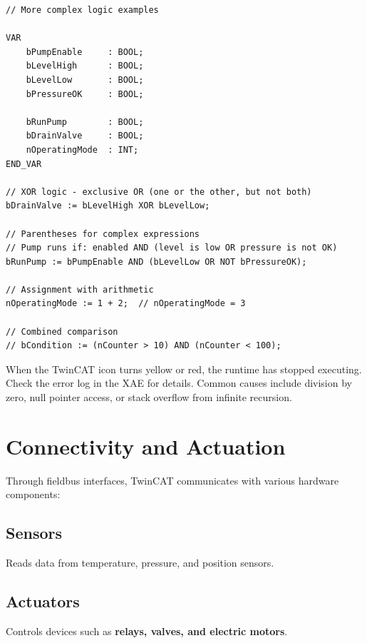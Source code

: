 \documentclass[11pt,a4paper]{article}
\begin{document}
\begin{lstlisting}
// More complex logic examples

VAR
    bPumpEnable     : BOOL;
    bLevelHigh      : BOOL;
    bLevelLow       : BOOL;
    bPressureOK     : BOOL;
    
    bRunPump        : BOOL;
    bDrainValve     : BOOL;
    nOperatingMode  : INT;
END_VAR

// XOR logic - exclusive OR (one or the other, but not both)
bDrainValve := bLevelHigh XOR bLevelLow;

// Parentheses for complex expressions
// Pump runs if: enabled AND (level is low OR pressure is not OK)
bRunPump := bPumpEnable AND (bLevelLow OR NOT bPressureOK);

// Assignment with arithmetic
nOperatingMode := 1 + 2;  // nOperatingMode = 3

// Combined comparison
// bCondition := (nCounter > 10) AND (nCounter < 100);
\end{lstlisting}

\begin{warningbox}
When the TwinCAT icon turns yellow or red, the runtime has stopped executing. Check the error log in the XAE for details. Common causes include division by zero, null pointer access, or stack overflow from infinite recursion.
\end{warningbox}

\section{Connectivity and Actuation}

Through fieldbus interfaces, TwinCAT communicates with various hardware components:

\subsection{Sensors}

Reads data from temperature, pressure, and position sensors.

\subsection{Actuators}

Controls devices such as \textbf{relays, valves, and electric motors}.
\end{document}
